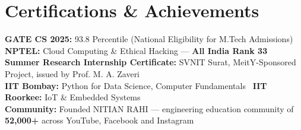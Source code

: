 \documentclass[10pt, legalpaper]{article}
\begin{document}
\section{Certifications \& Achievements}
{\small
\noindent\textbf{GATE CS 2025:} 93.8 Percentile (National Eligibility for M.Tech Admissions) \\
\noindent\textbf{NPTEL:} Cloud Computing \& Ethical Hacking --- \textbf{All India Rank 33} \\
\noindent\textbf{Summer Research Internship Certificate:} SVNIT Surat, MeitY-Sponsored Project, issued by Prof. M. A. Zaveri \\
\noindent\textbf{IIT Bombay:} Python for Data Science, Computer Fundamentals \textbar\ \textbf{IIT Roorkee:} IoT \& Embedded Systems \\
\noindent\textbf{Community:} Founded NITIAN RAHI --- engineering education community of \textbf{52,000+} across YouTube, Facebook and Instagram
}
\end{document}

